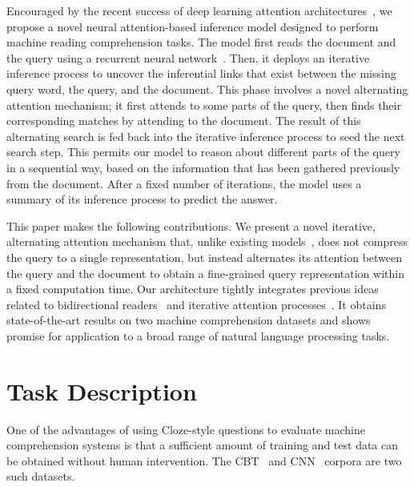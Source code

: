 \documentclass[11pt]{article}
\begin{document}
Encouraged by the recent success of deep learning attention architectures~\cite{bahdanau2014neural,sukhbaatar2015end}, we propose a novel neural attention-based inference model designed to perform machine reading comprehension tasks.
The model first reads the document and the query using a recurrent neural network~\cite{bengio_book}.
Then, it deploys an iterative inference process to uncover the inferential links that exist between the missing query word, the query, and the document. This phase involves a novel alternating attention mechanism; it first attends to some parts of the query, then finds their corresponding matches by attending to the document. 
The result of this alternating search is fed back into the iterative inference process to seed the next search step. This permits our model to reason about different parts of the query in a sequential way, based on the information that has been gathered previously from the document. After a fixed number of iterations, the model uses a summary of its inference process to predict the answer.


This paper makes the following contributions. We present a novel iterative, alternating attention mechanism that, unlike existing models~\cite{hill2015goldilocks,watson}, does not compress the query to a single representation, but instead alternates its attention between the query and the document to obtain a fine-grained query representation within a fixed computation time. Our architecture tightly integrates previous ideas related to bidirectional readers~\cite{watson} and iterative attention processes~\cite{hill2015goldilocks,sukhbaatar2015end}. It obtains state-of-the-art results on two machine comprehension datasets and shows promise for application to a broad range of natural language processing tasks.
















 
\section{Task Description}
\label{sec:task}
One of the advantages of using Cloze-style questions to evaluate machine comprehension systems is that a sufficient amount of training and test data can be obtained without human intervention. The CBT~\cite{hill2015goldilocks} and CNN~\cite{hermann2015teaching} corpora are two such datasets.
\end{document}
